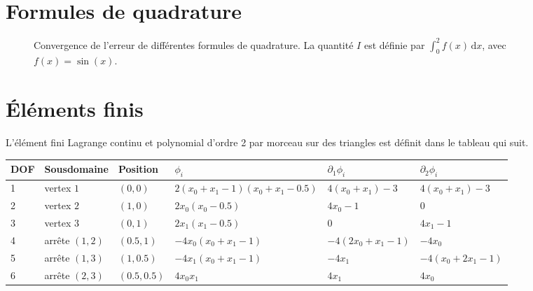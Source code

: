 \section{Formules de quadrature}
\begin{figure}
  \begin{center}
    
    \caption{Convergence de l'erreur de différentes formules de quadrature. La quantité $I$ est définie par $\int_0^2 f(x)\,\mathrm dx$, avec $f(x) = \sin(x)$.}
    \label{fig:quadrature-convergence-1d}
  \end{center}
\end{figure}



\section{Éléments finis}
L'élément fini Lagrange continu et polynomial d'ordre 2 par morceau
sur des triangles est définit dans le tableau qui suit.

\begin{tabularx}{\textwidth}{@{}llllll@{}}
  \toprule
  DOF & Sousdomaine & Position & $\phi_i$ & $\partial_1\phi_i$
& $\partial_2\phi_i$ \\
  \midrule
  1 & vertex $1$     & $(0, 0)$     & $2(x_0 + x_1 - 1)(x_0 + x_1 - 0.5)$  & $4(x_0 + x_1) - 3$  & $4(x_0 + x_1) - 3$ \\
  2 & vertex $2$     & $(1, 0)$     & $2x_0(x_0 - 0.5) $                  & $4x_0 - 1$          & $0$ \\
  3 & vertex $3$     & $(0, 1)$     & $2x_1(x_1 - 0.5) $                  & $0$                 & $4x_1 - 1$ \\
  4 & arrête $(1,2)$ & $(0.5, 1)$   & $-4x_0(x_0 + x_1 - 1) $             & $-4(2x_0+x_1 - 1)$  & $-4x_0$ \\
  5 & arrête $(1,3)$ & $(1, 0.5)$   & $-4x_1(x_0 + x_1 - 1) $             & $-4x_1$             & $-4(x_0 + 2x_1 - 1)$ \\
  6 & arrête $(2,3)$ & $(0.5, 0.5)$ & $4x_0x_1 $                          & $4x_1$              & $4x_0$ \\
  \bottomrule
\end{tabularx}
